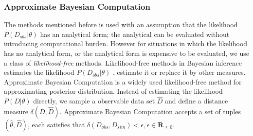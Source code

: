 \subsubsection{Approximate Bayesian Computation}
The methods mentioned before is used with an assumption that the likelihood $P(D_{obs}|\theta)$ has
an analytical form; the analytical can be evaluated without introducing computational burden.
However for situations in which the likelihood has no analytical form, or the analytical form is
expensive to be evaluated, we use a class of \textit{likelihood-free} methods. Likelihood-free
methods in Bayesian inference estimates the likelihood $P(D_{obs}|\theta)$ ,
estimate it or replace it by other measures. Approximate Bayesian Computation is a widely used
likelihood-free method for approximating posterior distribution. Instead of estimating the
likelihood $P(D|\theta)$ directly, we sample a observable data set $\hat{D}$ and define a distance
measure $\delta(D, \hat{D})$. Approximate Bayesian Computation accepts a set of tuples
$(\hat{\theta}, \hat{D})$, each satisfies that $\delta(D_{obs},D_{sim}) < \epsilon,
    \epsilon\in\mathbf{R}_{\leq 0}$.
